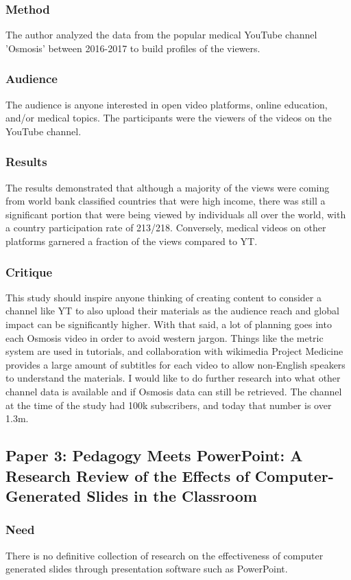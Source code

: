 \documentclass[
	letterpaper, %
]{jdf}
\begin{document}
\subsubsection{Method}
The author analyzed the data from the popular medical YouTube channel 'Osmosis' between 2016-2017 to build profiles of the viewers.
\subsubsection{Audience}
The audience is anyone interested in open video platforms, online education, and/or medical topics. The participants were the viewers of the videos on the YouTube channel. 
\subsubsection{Results}
The results demonstrated that although a majority of the views were coming from world bank classified countries that were high income, there was still a significant portion that were being viewed by individuals all over the world, with a country participation rate of 213/218. Conversely, medical videos on other platforms garnered a fraction of the views compared to YT.
\subsubsection{Critique}
This study should inspire anyone thinking of creating content to consider a channel like YT to also upload their materials as the audience reach and global impact can be significantly higher. With that said, a lot of planning goes into each Osmosis video in order to avoid western jargon. Things like the metric system are used in tutorials, and collaboration with wikimedia Project Medicine provides a large amount of subtitles for each video to allow non-English speakers to understand the materials. I would like to do further research into what other channel data is available and if Osmosis data can still be retrieved. The channel at the time of the study had 100k subscribers, and today that number is over 1.3m.

\subsection{Paper 3: Pedagogy Meets PowerPoint: A Research Review of the Effects of Computer-Generated Slides in the Classroom \citep{leva1}}
\subsubsection{Need}
There is no definitive collection of research on the effectiveness of computer generated slides through presentation software such as PowerPoint.
\end{document}
